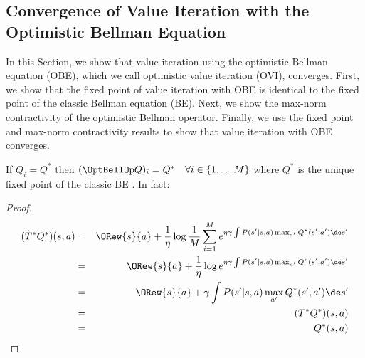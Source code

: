 \subsection{Convergence of Value Iteration with the Optimistic Bellman Equation}
In this Section, we show that value iteration using the optimistic Bellman equation (OBE), which
we call optimistic value iteration (OVI), converges. First, we show that the fixed point of value
iteration with OBE is identical to the fixed point of the classic Bellman equation (BE). Next, we show
the max-norm contractivity of the optimistic
Bellman operator. Finally, we use the fixed point and max-norm contractivity results to show that value iteration with OBE converges.
\begin{lemma}
	If $Q_i = Q^*$ then $(\OptBellOp Q)_i = Q^* \quad \forall i \in \{1, \dots M\}$ where $Q^*$ is the unique fixed point of the classic BE .
	In fact:
	\begin{proof}
		\begin{eqnarray}
		(\tilde{T}^*Q^*)(s,a) & = & \ORew{s}{a} +  \frac{1}{\eta}\log \frac{1}{M} \sum_{i=1}^{M} e^{\eta\gamma \int P(s'|s,a) \max_{a'} Q^*(s',a')\de s'} \nonumber \\
		& = & \ORew{s}{a} +  \frac{1}{\eta}\log  e^{\eta\gamma \int P(s'|s,a) \max_{a'} Q^*(s',a')\de s'} \nonumber \\
		& = & \ORew{s}{a} +  \gamma \int P(s'|s,a) \max_{a'} Q^*(s',a')\de s' \nonumber \\
		& = & (T^*Q^*)(s,a) \nonumber \\
		& = & Q^*(s,a) \nonumber
		\end{eqnarray}
	\end{proof}
\end{lemma}

